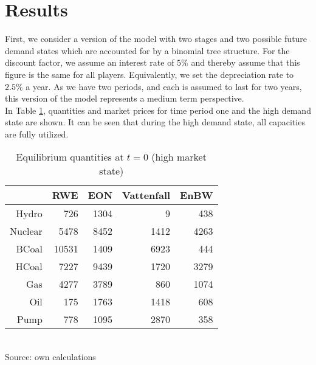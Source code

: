 \section{Results} 

First, we consider a version of the model with two stages and two possible future demand states which are accounted for by a binomial tree structure. For the discount factor, we assume an interest rate of $5\%$ and thereby assume that this figure is the same for all players. Equivalently, we set the depreciation rate to $2.5\%$ a year. As we have two periods, and each is assumed to last for two years, this version of the model represents a medium term perspective. \\
In Table \ref{tab:quant}, quantities and market prices for time period one and the high demand state are shown. It can be seen that during the high demand state, all capacities are fully utilized.

\begin{table}[htb]
\centering
\caption{Equilibrium quantities at $t=0$ (high market state)}
\vspace{0.3cm}
\begin{tabular}{rrrrr}
\hline
           &        RWE &        EON & Vattenfall &       EnBW \\
\hline
     Hydro &        726 &       1304 &          9 &        438 \\

   Nuclear &       5478 &       8452 &       1412 &       4263 \\

     BCoal &      10531 &       1409 &       6923 &        444 \\

     HCoal &       7227 &       9439 &       1720 &       3279 \\

       Gas &       4277 &       3789 &        860 &       1074 \\

       Oil &        175 &       1763 &       1418 &        608 \\

      Pump &        778 &       1095 &       2870 &        358 \\
\hline
\end{tabular}  
\label{tab:quant}
\\
\vspace{0.3cm}
\scriptsize Source: own calculations
\end{table}


